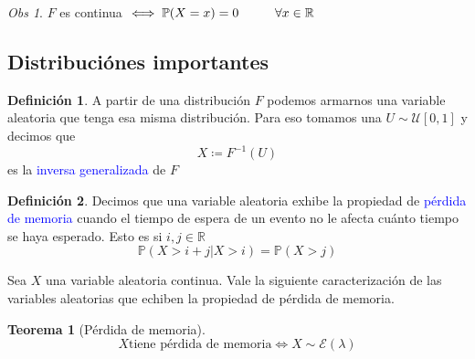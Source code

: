 \documentclass[11pt]{article}
\theoremstyle{plain} %
\newtheorem{teorema}{Teorema}
\theoremstyle{definition}
\newtheorem*{definicion}{Definici\'{o}n} %
\theoremstyle{remark}
\newtheorem{obs}{Obs}
\def\R{\mathbb{R}}
\def\P{\mathbb{P}}
\def\va{variable aleatoria }
\def\vas{variables aleatorias }
\def\blue{\textcolor{blue}}
\begin{document}
\begin{obs}
	$F$ es continua $\iff \P(X=x) = 0 \hskip 1cm \forall x \in \R$ 
\end{obs}

\bigskip

\subsection{Distribuci\'ones importantes}

\begin{definicion}
	
	A partir de una distribuci\'on $F$ podemos armarnos una \va que tenga esa misma distribuci\'on. Para eso tomamos una $U \sim \mathcal{U}[0,1] $ y decimos que \[X \coloneqq F^{-1}(U)\]
	es la \blue{inversa generalizada} de $F$
\end{definicion}

\begin{definicion}
	\label{def:permem}
	Decimos que una \va exhibe la propiedad de \blue{p\'erdida de memoria} cuando el tiempo de espera de un evento no le afecta cu\'anto tiempo se haya esperado. Esto es si $i,j \in \R$
	\[\P(X>i+j | X > i) = \P(X>j)  \]
\end{definicion}

Sea $X$ una \va continua. Vale la siguiente caracterizaci\'on de las \vas que echiben la propiedad de pérdida de memoria.

\begin{teorema}
	[P\'erdida de memoria]
	
	\[X \text{tiene p\'erdida de memoria} \iff X \sim \mathcal{E}(\lambda) \]
\end{teorema}
\end{document}
